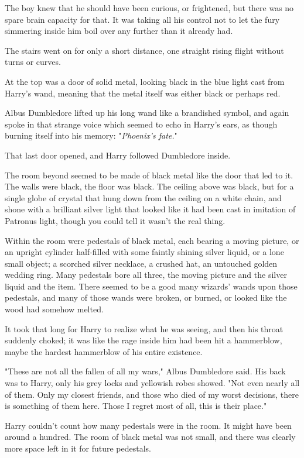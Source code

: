 The boy knew that he should have been curious, or frightened, but there was no
spare brain capacity for that. It was taking all his control not to let the
fury simmering inside him boil over any further than it already had.

The stairs went on for only a short distance, one straight rising flight
without turns or curves.

At the top was a door of solid metal, looking black in the blue light cast from
Harry's wand, meaning that the metal itself was either black or perhaps red.

Albus Dumbledore lifted up his long wand like a brandished symbol, and again
spoke in that strange voice which seemed to echo in Harry's ears, as though
burning itself into his memory: "\emph{Phoenix's fate.}"

That last door opened, and Harry followed Dumbledore inside.

The room beyond seemed to be made of black metal like the door that led to it.
The walls were black, the floor was black. The ceiling above was black, but for
a single globe of crystal that hung down from the ceiling on a white chain, and
shone with a brilliant silver light that looked like it had been cast in
imitation of Patronus light, though you could tell it wasn't the real thing.

Within the room were pedestals of black metal, each bearing a moving picture,
or an upright cylinder half-filled with some faintly shining silver liquid, or
a lone small object; a scorched silver necklace, a crushed hat, an untouched
golden wedding ring. Many pedestals bore all three, the moving picture and the
silver liquid and the item. There seemed to be a good many wizards' wands upon
those pedestals, and many of those wands were broken, or burned, or looked like
the wood had somehow melted.

It took that long for Harry to realize what he was seeing, and then his throat
suddenly choked; it was like the rage inside him had been hit a hammerblow,
maybe the hardest hammerblow of his entire existence.

"These are not all the fallen of all my wars," Albus Dumbledore said. His back
was to Harry, only his grey locks and yellowish robes showed. "Not even nearly
all of them. Only my closest friends, and those who died of my worst decisions,
there is something of them here. Those I regret most of all, this is their
place."

Harry couldn't count how many pedestals were in the room. It might have been
around a hundred. The room of black metal was not small, and there was clearly
more space left in it for future pedestals.

